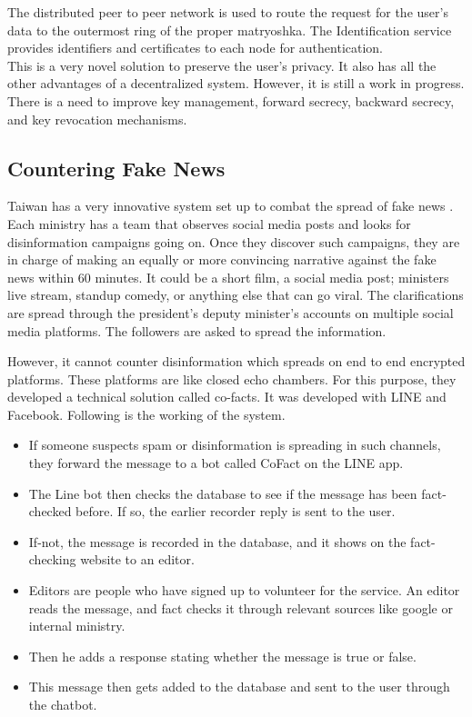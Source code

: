 \documentclass[11pt, conference, a4paper]{IEEEtran}
\begin{document}
The distributed peer to peer network is used to route the request for the user's data to the outermost ring of the proper matryoshka.
The Identification service provides identifiers and certificates to each node for authentication.\\
This is a very novel solution to preserve the user's privacy. It also has all the other advantages of a decentralized system. However, it is still a work in progress. There is a need to improve key management, forward secrecy, backward secrecy, and key revocation mechanisms.

\subsection{Countering Fake News}
Taiwan has a very innovative system set up to combat the spread of fake news \cite{co-facts}. Each ministry has a team that observes social media posts and looks for disinformation campaigns going on. Once they discover such campaigns, they are in charge of making an equally or more convincing narrative against the fake news within 60 minutes. It could be a short film, a social media post; ministers live stream, standup comedy, or anything else that can go viral. The clarifications are spread through the president's deputy minister's accounts on multiple social media platforms. The followers are asked to spread the information.
\par
However, it cannot counter disinformation which spreads on end to end encrypted platforms. These platforms are like closed echo chambers. For this purpose, they developed a technical solution called co-facts. It was developed with LINE and Facebook. Following is the working of the system.
\begin{itemize}
\item If someone suspects spam or disinformation is spreading in such channels, they forward the message to a bot called CoFact on the LINE app.
\item The Line bot then checks the database to see if the message has been fact-checked before. If so, the earlier recorder reply is sent to the user.
\item If-not, the message is recorded in the database, and it shows on the fact-checking website to an editor.
\item Editors are people who have signed up to volunteer for the service. An editor reads the message, and fact checks it through relevant sources like google or internal ministry.
\item Then he adds a response stating whether the message is true or false.
\item This message then gets added to the database and sent to the user through the chatbot.
\end{itemize}
\end{document}
